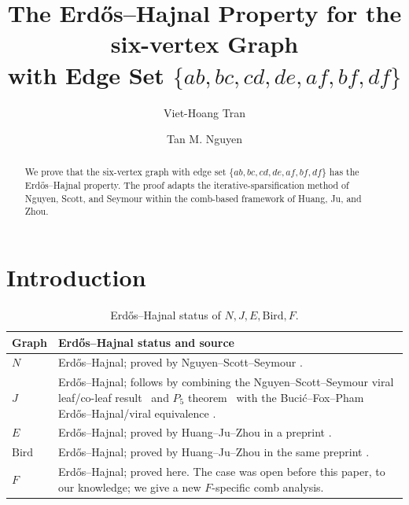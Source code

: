 \documentclass[11pt]{article}
\title{The Erd\H{o}s--Hajnal Property for the six-vertex Graph\\
with Edge Set $\{ab,bc,cd,de,af,bf,df\}$}
\author[1]{Viet-Hoang Tran}
\author[1]{Tan M. Nguyen}
\affil[1]{Department of Mathematics, National University of Singapore}
\date{}
\numberwithin{equation}{section}
\theoremstyle{plain}
\theoremstyle{definition}
\begin{document}
\maketitle

\begin{abstract}
We prove that the six-vertex graph with edge set $\{ab,bc,cd,de,af,bf,df\}$ has the  Erd\H{o}s--Hajnal property. The proof adapts the iterative-sparsification method of Nguyen, Scott, and Seymour within the comb-based framework of Huang, Ju, and Zhou.
\end{abstract}

\begingroup
\footnotesize
\tableofcontents
\endgroup
\clearpage

\section{Introduction}
\label{sec:introduction}

\begin{table}[!t]
\centering
\footnotesize
\setlength{\tabcolsep}{4pt}
\renewcommand{\arraystretch}{1.05}
\caption{Erd\H{o}s--Hajnal status of $N,J,E,\mathrm{Bird},F$.}
\vspace{6pt}
\label{tab:six-vertex-status}
\begin{tabularx}{\textwidth}{@{}
 >{\raggedright\arraybackslash}p{}
 >{\raggedright\arraybackslash}X@{}}
\toprule
\textbf{Graph} & \textbf{Erd\H{o}s--Hajnal status and source} \\
\midrule
$N$
& Erd\H{o}s--Hajnal; proved by Nguyen--Scott--Seymour
  \cite[Theorem~1.4 and Figure~1]{NguyenScottSeymourDensityIV}. \\
\addlinespace[3pt]
$J$
& Erd\H{o}s--Hajnal; follows by combining the Nguyen--Scott--Seymour viral leaf/co-leaf
  result~\cite[Theorem~7.8 and p.~22]{NguyenScottSeymourDensityIV} and
  $P_5$ theorem~\cite{NguyenScottSeymourP5} with the Buci\'c--Fox--Pham
  Erd\H{o}s--Hajnal/viral equivalence
  \cite[Theorem~4]{BucicFoxPham2024}. \\
\addlinespace[3pt]
$E$
& Erd\H{o}s--Hajnal; proved by Huang--Ju--Zhou in a preprint
  \cite[Theorem~1.10]{HuangJuZhou2026}. \\
\addlinespace[3pt]
$\mathrm{Bird}$
& Erd\H{o}s--Hajnal; proved by Huang--Ju--Zhou in the same preprint
  \cite[Theorem~1.11]{HuangJuZhou2026}. \\
\addlinespace[3pt]
$F$
& Erd\H{o}s--Hajnal; proved here.  The case was open before this paper,
  to our knowledge; we give a new $F$-specific comb analysis. \\
\bottomrule
\end{tabularx}
\end{table}
\end{document}

